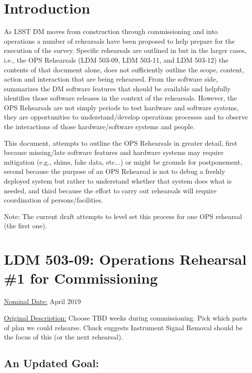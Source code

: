 
\section{Introduction}

As LSST DM moves from construction through commissioning and into operations 
a number of rehearsals have been proposed to help prepare for the execution 
of the survey.  Specific rehearsals are outlined in  but in 
the larger cases, i.e., the OPS Rehearsals (LDM 503-09, LDM 503-11, and 
LDM 503-12) the contents of that document alone, does not sufficiently outline 
the scope, content, action and interaction that are being rehearsed.  
From the software side, 
summarizes the DM software features that should be available and helpfully 
identifies those software releases in the context of the rehearsals.  
However, the OPS Rehearsals are not simply periods to test hardware and 
software systems, they are opportunities to understand/develop operations 
processes and to observe the interactions of those hardware/software systems 
and people. 

This document, attempts to outline the OPS Rehearsals in greater detail, 
first because missing/late software features and hardware systems may 
require mitigation (e.g., shims, fake data, etc...) or might be grounds for 
postponement, second because the purpose of an OPS Rehearsal is not to debug 
a freshly deployed system but rather to understand whether that system does
what is needed, and third because the effort to carry out rehearsals will 
require coordination of persons/facilities. 

Note: The current draft attempts to level set this process for one OPS 
rehearsal (the first one).


\section{LDM 503-09: Operations Rehearsal \#1 for Commissioning}

\underline{Nominal Date:} April 2019

\underline{Original Description:}
Choose TBD weeks during commissioning. Pick which parts of plan we could 
rehearse.  Chuck suggests Instrument Signal Removal should be the focus 
of this (or the next rehearsal).

\clearpage

\subsection{An Updated Goal:}

